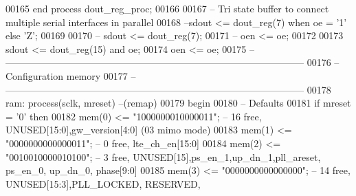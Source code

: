 \begin{DoxyCode}
00165     \textcolor{keywordflow}{end} \textcolor{keywordflow}{process} \textcolor{vhdlchar}{dout\_reg\_proc};
00166     
00167 \textcolor{keyword}{    -- Tri state buffer to connect multiple serial interfaces in parallel}
00168 \textcolor{keyword}{    --sdout <= dout\_reg(7) when oe = '1' else 'Z';}
00169 
00170 \textcolor{keyword}{--  sdout <= dout\_reg(7);}
00171 \textcolor{keyword}{--  oen <= oe;}
00172 
00173     \textcolor{vhdlchar}{sdout} \textcolor{vhdlchar}{<=} \textcolor{vhdlchar}{dout_reg}\textcolor{vhdlchar}{(}\textcolor{vhdllogic}{}\textcolor{vhdllogic}{15}\textcolor{vhdlchar}{)} \textcolor{keywordflow}{and} \textcolor{vhdlchar}{oe};
00174     \textcolor{vhdlchar}{oen} \textcolor{vhdlchar}{<=} \textcolor{vhdlchar}{oe};
00175 \textcolor{keyword}{    -- ---------------------------------------------------------------------------------------------}
00176 \textcolor{keyword}{    -- Configuration memory}
00177 \textcolor{keyword}{    -- --------------------------------------------------------------------------------------------- }
00178     ram: \textcolor{keywordflow}{process}(sclk, mreset)\textcolor{keyword}{ --(remap)}
00179 \textcolor{vhdlkeyword}{    begin}
00180 \textcolor{keyword}{        -- Defaults}
00181         \textcolor{keywordflow}{if} \textcolor{vhdlchar}{mreset} \textcolor{vhdlchar}{=} \textcolor{vhdlchar}{'}\textcolor{vhdllogic}{}\textcolor{vhdllogic}{0}\textcolor{vhdlchar}{'} \textcolor{keywordflow}{then}            
00182             \textcolor{vhdlchar}{mem}\textcolor{vhdlchar}{(}\textcolor{vhdllogic}{}\textcolor{vhdllogic}{0}\textcolor{vhdlchar}{)}      \textcolor{vhdlchar}{<=} \textcolor{vhdllogic}{"1000000010000011"};\textcolor{keyword}{ --  16 free, UNUSED[15:0],gw\_version[4:0] (03 mimo mode)}
00183             \textcolor{vhdlchar}{mem}\textcolor{vhdlchar}{(}\textcolor{vhdllogic}{}\textcolor{vhdllogic}{1}\textcolor{vhdlchar}{)}      \textcolor{vhdlchar}{<=} \textcolor{vhdllogic}{"0000000000000011"};\textcolor{keyword}{ --  0 free, lte\_ch\_en[15:0]}
00184             \textcolor{vhdlchar}{mem}\textcolor{vhdlchar}{(}\textcolor{vhdllogic}{}\textcolor{vhdllogic}{2}\textcolor{vhdlchar}{)}      \textcolor{vhdlchar}{<=} \textcolor{vhdllogic}{"0010010000010100"};\textcolor{keyword}{ --  3 free, UNUSED[15],ps\_en\_1,up\_dn\_1,pll\_areset, ps\_en\_0,
       up\_dn\_0, phase[9:0]}
00185             \textcolor{vhdlchar}{mem}\textcolor{vhdlchar}{(}\textcolor{vhdllogic}{}\textcolor{vhdllogic}{3}\textcolor{vhdlchar}{)}      \textcolor{vhdlchar}{<=} \textcolor{vhdllogic}{"0000000000000000"};\textcolor{keyword}{ --  14 free, UNUSED[15:3],PLL\_LOCKED, RESERVED,
}
\end{DoxyCode}

